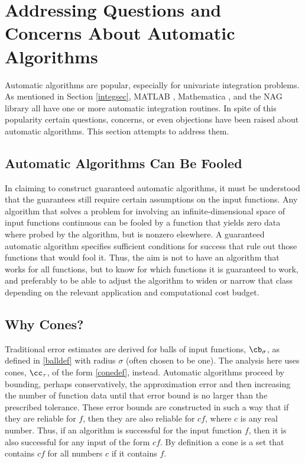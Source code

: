 \documentclass[]{elsarticle}
\theoremstyle{definition}
\theoremstyle{remark}
\begin{document}


\section{Addressing Questions and Concerns About Automatic Algorithms} \label{overcomesec}

Automatic algorithms are popular, especially for univariate integration problems.  As mentioned in Section \ref{integsec}, MATLAB \cite{TrefEtal12,MAT7.12}, Mathematica \cite{Mat8a}, and the NAG \cite{NAG23} library all have one or more automatic integration routines.  In spite of this popularity certain questions, concerns, or even objections have been raised about automatic algorithms.  This section attempts to address them.


\subsection{Automatic Algorithms Can Be Fooled}  

In claiming to construct guaranteed automatic algorithms, it must be understood that the guarantees still require certain assumptions on the input functions.  Any algorithm that solves a problem for involving an infinite-dimensional space of input functions continuous can be fooled by a function that yields zero data where probed by the algorithm, but is nonzero elsewhere.  A guaranteed automatic algorithm specifies sufficient conditions for success that rule out those functions that would fool it.  Thus, the aim is not to have an algorithm that works for all functions, but to know for which functions it is guaranteed to work, and preferably to be able to adjust the algorithm to widen or narrow that class depending on the relevant application and computational cost budget.

\subsection{Why Cones?}

Traditional error estimates are derived for balls of input functions, $\cb_{\sigma}$, as defined in \eqref{balldef} with radius $\sigma$ (often chosen to be one).  The analysis here uses cones, $\cc_{\tau}$, of the form \eqref{conedef}, instead.  Automatic algorithms proceed by bounding, perhaps conservatively, the approximation error and then increasing the number of function data until that error bound is no larger than the prescribed tolerance.  These error bounds are constructed in such a way that if they are reliable for $f$, then they are also reliable for $cf$, where $c$ is any real number.  Thus, if an algorithm is successful for the input function $f$, then it is also successful for any input of the form $cf$.  By definition a cone is a set that contains $cf$ for all numbers $c$ if it contains $f$.
\end{document}
